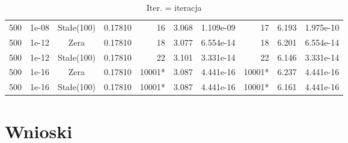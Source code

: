 \documentclass[twoside]{article}
\begin{document}
\begin{table}[H]
\begin{tabular}{c c c c r c c r c c}
500 & 1e-08 & Stałe(100) & 0.17810 & 16 & 3.068 & 1.109e-09 & 17 & 6.193 & 1.975e-10 \\
500 & 1e-12 & Zera & 0.17810 & 18 & 3.077 & 6.554e-14 & 18 & 6.201 & 6.554e-14 \\
500 & 1e-12 & Stałe(100) & 0.17810 & 22 & 3.101 & 3.331e-14 & 22 & 6.146 & 3.331e-14 \\
500 & 1e-16 & Zera & 0.17810 & 10001* & 3.087 & 4.441e-16 & 10001* & 6.237 & 4.441e-16 \\
500 & 1e-16 & Stałe(100) & 0.17810 & 10001* & 3.087 & 4.441e-16 & 10001* & 6.161 & 4.441e-16 \\
\bottomrule
\end{tabular}
\caption{Iter. = iteracja}
\label{tab:wyniki}
\end{table}

\section{Wnioski}
\end{document}
